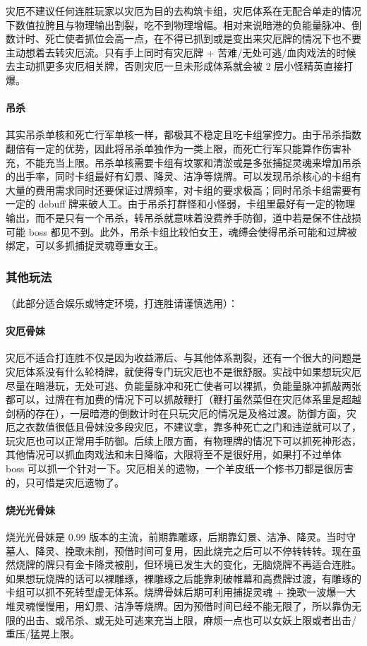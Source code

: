 \documentclass[12pt, a4paper]{article}
\begin{document}
灾厄不建议任何连胜玩家以灾厄为目的去构筑卡组，灾厄体系在无配合单走的情况下数值拉胯且与物理输出割裂，吃不到物理增幅。相对来说暗港的负能量脉冲、倒数计时、死亡使者抓位会高一点，在不得已抓到或是变出来灾厄牌的情况下也不要主动想着去转灾厄流。只有手上同时有灾厄牌 + 苦难/无处可逃/血肉戏法的时候去主动抓更多灾厄相关牌，否则灾厄一旦未形成体系就会被 2 层小怪精英直接打爆。

\paragraph{吊杀}
其实吊杀单核和死亡行军单核一样，都极其不稳定且吃卡组掌控力。由于吊杀指数翻倍有一定的优势，因此将吊杀单独作为一类上限，而死亡行军只能算作伤害补充，不能充当上限。吊杀单核需要卡组有坟冢和清淤或是多张捕捉灵魂来增加吊杀的出手率，同时卡组最好有幻景、降灵、洁净等烧牌。可以发现吊杀核心的卡组有大量的费用需求同时还要保证过牌频率，对卡组的要求极高；同时吊杀卡组需要有一定的 debuff 牌来破人工。由于吊杀打群怪和小怪弱，卡组里最好有一定的物理输出，而不是只有一个吊杀，转吊杀就意味着没费养手防御，道中若是保不住战损可能 boss 都见不到。此外，吊杀卡组比较怕女王，魂缚会使得吊杀可能和过牌被绑定，可以多抓捕捉灵魂尊重女王。

\subsubsection{其他玩法}
（此部分适合娱乐或特定环境，打连胜请谨慎选用）：

\paragraph{灾厄骨妹}
灾厄不适合打连胜不仅是因为收益滞后、与其他体系割裂，还有一个很大的问题是灾厄体系没有什么轮椅牌，就使得专门玩灾厄也不是很舒服。实战中如果想玩灾厄尽量在暗港玩，无处可逃、负能量脉冲和死亡使者可以裸抓，负能量脉冲抓敲两张都可以，过牌在有加费的情况下可以抓敲鞭打（鞭打虽然菜但在灾厄体系里是超越剑柄的存在），一层暗港的倒数计时在只玩灾厄的情况是及格过渡。防御方面，灾厄之衣数值很低且骨妹没多段灾厄，不建议拿，靠多种死亡之门和违逆就可以了，玩灾厄也可以正常用手防御。后续上限方面，有物理牌的情况下可以抓死神形态，其他情况可以抓血肉戏法和末日降临，大限将至不是很好用，如果打不过单体 boss 可以抓一个针对一下。灾厄相关的遗物，一个羊皮纸一个修书刀都是很厉害的，只可惜是灾厄遗物了。

\paragraph{烧光光骨妹}
烧光光骨妹是 0.99 版本的主流，前期靠雕琢，后期靠幻景、洁净、降灵。当时守墓人、降灵、挽歌未削，预借时间可复用，因此烧完之后可以不停转转转。现在虽然烧牌的牌只有金卡降灵被削，但环境已发生大的变化，无脑烧牌不再适合连胜。如果想玩烧牌的话可以裸雕琢，裸雕琢之后能靠刺破帷幕和高费牌过渡，有雕琢的卡组可以抓不死转型虚无体系。烧牌骨妹后期可利用捕捉灵魂 + 挽歌一波爆一大堆灵魂慢慢用，用幻景、洁净等烧牌。因为预借时间已经不能无限了，所以靠伪无限的出击、或吊杀、或无处可逃来充当上限，麻烦一点也可以女妖上限或者出击/重压/猛晃上限。
\end{document}
